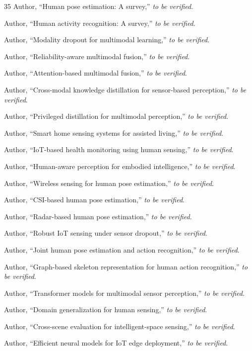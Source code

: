 \documentclass[journal]{IEEEtran}
\begin{document}
\begin{thebibliography}{35}
Author, ``Human pose estimation: A survey,'' \emph{to be verified}.

Author, ``Human activity recognition: A survey,'' \emph{to be verified}.

Author, ``Modality dropout for multimodal learning,'' \emph{to be verified}.

Author, ``Reliability-aware multimodal fusion,'' \emph{to be verified}.

Author, ``Attention-based multimodal fusion,'' \emph{to be verified}.

Author, ``Cross-modal knowledge distillation for sensor-based perception,'' \emph{to be verified}.

Author, ``Privileged distillation for multimodal perception,'' \emph{to be verified}.

Author, ``Smart home sensing systems for assisted living,'' \emph{to be verified}.

Author, ``IoT-based health monitoring using human sensing,'' \emph{to be verified}.

Author, ``Human-aware perception for embodied intelligence,'' \emph{to be verified}.

Author, ``Wireless sensing for human pose estimation,'' \emph{to be verified}.

Author, ``CSI-based human pose estimation,'' \emph{to be verified}.

Author, ``Radar-based human pose estimation,'' \emph{to be verified}.

Author, ``Robust IoT sensing under sensor dropout,'' \emph{to be verified}.

Author, ``Joint human pose estimation and action recognition,'' \emph{to be verified}.

Author, ``Graph-based skeleton representation for human action recognition,'' \emph{to be verified}.

Author, ``Transformer models for multimodal sensor perception,'' \emph{to be verified}.

Author, ``Domain generalization for human sensing,'' \emph{to be verified}.

Author, ``Cross-scene evaluation for intelligent-space sensing,'' \emph{to be verified}.

Author, ``Efficient neural models for IoT edge deployment,'' \emph{to be verified}.

\end{thebibliography}
\end{document}
